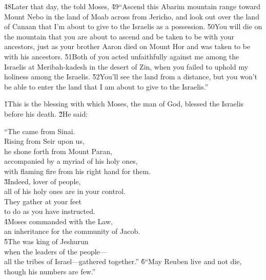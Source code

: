 \v{48}Later that day, the  told Moses, \v{49}``Ascend this Abarim mountain range toward Mount Nebo in the land of Moab across from Jericho, and look out over the land of Canaan that I'm about to give to the Israelis as a possession. \v{50}You will die on the mountain that you are about to ascend and be taken to be with your ancestors, just as your brother Aaron died on Mount Hor and was taken to be with his ancestors. \v{51}Both of you acted unfaithfully against me among the Israelis at Meribah-kadesh in the desert of Zin, when you failed to uphold my holiness among the Israelis. \v{52}You'll see the land from a distance, but you won't be able to enter the land that I am about to give to the Israelis.''

\v{1}This is the blessing with which Moses, the man of God, blessed the Israelis before his death. \v{2}He said:

\begin{poetry}
\poeml ``The  came from Sinai. \\
\poemll    Rising from Seir upon us, \\
\poeml he shone forth from Mount Paran, \\
\poemll    accompanied by a myriad of his holy ones, \\
\poemlll       with flaming fire from his right hand for them. \\
\poeml \v{3}Indeed, lover of people, \\
\poemll    all of his holy ones are in your control. \\
\poeml They gather at your feet \\
\poemll    to do as you have instructed. \\
\poeml \v{4}Moses commanded with the Law, \\
\poemll    an inheritance for the community of Jacob. \\
\poeml \v{5}The  was king of Jeshurun \\
\poemll    when the leaders of the people--- \\
\poemlll       all the tribes of Israel---gathered together.''
\poeml \v{6}``May Reuben live and not die, \\
\poemll    though his numbers are few.''
\end{poetry}

